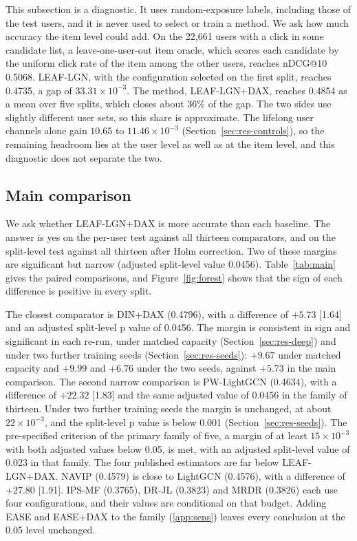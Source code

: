 \documentclass[preprint,12pt,authoryear]{elsarticle}
\begin{document}
This subsection is a diagnostic. It uses random-exposure labels, including those of the test users, and it is never used to select or train a
method. We ask how much accuracy the item level could add. On the 22,661 users with a click in some candidate list, a leave-one-user-out item
oracle, which scores each candidate by the uniform click rate of the item among the other users, reaches nDCG@10 0.5068. LEAF-LGN, with the
configuration selected on the first split, reaches 0.4735, a gap of $33.31\times10^{-3}$. The method, LEAF-LGN+DAX, reaches 0.4854 as a mean over
five splits, which closes about 36\% of the gap. The two sides use slightly different user sets, so this share is approximate. The lifelong user
channels alone gain $10.65$ to $11.46\times10^{-3}$ (Section~\ref{sec:res-controls}), so the remaining headroom lies at the user level as well as at
the item level, and this diagnostic does not separate the two.

\subsection{Main comparison}
\label{sec:res-main}

We ask whether LEAF-LGN+DAX is more accurate than each baseline. The answer is yes on the per-user test against all thirteen comparators, and on the
split-level test against all thirteen after Holm correction. Two of these margins are significant but narrow (adjusted split-level value 0.0456). Table~\ref{tab:main} gives the paired
comparisons, and Figure~\ref{fig:forest} shows that the sign of each difference is positive in every split.

The closest comparator is DIN+DAX (0.4796), with a difference of $+5.73$ [1.64] and an adjusted split-level p value of 0.0456. The margin is consistent in sign and significant in each re-run, under matched capacity (Section~\ref{sec:res-deep}) and under two further training seeds (Section~\ref{sec:res-seeds}): $+9.67$ under matched capacity and $+9.99$ and $+6.76$ under the two seeds, against $+5.73$ in the main comparison. The second narrow
comparison is PW-LightGCN (0.4634), with a difference of $+22.32$ [1.83] and the same adjusted value of 0.0456 in the family of thirteen. Under two further training seeds the margin is unchanged, at about $22\times10^{-3}$, and the split-level p value is below 0.001 (Section~\ref{sec:res-seeds}). The
pre-specified criterion of the primary family of five, a margin of at least $15\times10^{-3}$ with both adjusted values below 0.05, is met, with an
adjusted split-level value of 0.023 in that family. The four published estimators are far below LEAF-LGN+DAX. NAVIP (0.4579) is close to LightGCN
(0.4576), with a difference of $+27.80$ [1.91]. IPS-MF (0.3765), DR-JL (0.3823) and MRDR (0.3826) each use four configurations, and their values are
conditional on that budget. Adding EASE and EASE+DAX to the family (\ref{app:sens}) leaves every conclusion at the 0.05 level unchanged.
\end{document}
